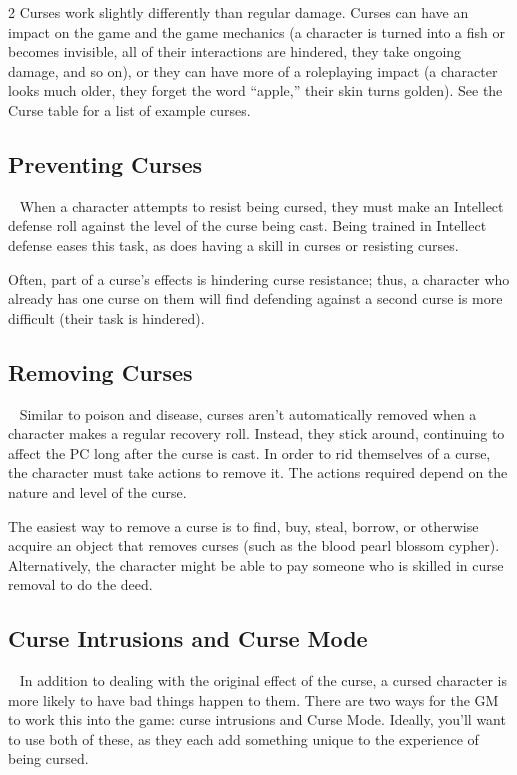 \begin{multicols}{2}
Curses work slightly differently than regular damage. Curses can have an impact on the game and the game mechanics (a character is turned into a fish or becomes invisible, all of their interactions are hindered, they take ongoing damage, and so on), or they can have more of a roleplaying impact (a character looks much older, they forget the word “apple,” their skin turns golden). See the Curse table for a list of example curses.

\subsection{Preventing Curses}
 
When a character attempts to resist being cursed, they must make an Intellect defense roll against the level of the curse being cast. Being trained in Intellect defense eases this task, as does having a skill in curses or resisting curses.

Often, part of a curse’s effects is hindering curse resistance; thus, a character who already has one curse on them will find defending against a second curse is more difficult (their task is hindered).

\subsection{Removing Curses}
 
Similar to poison and disease, curses aren’t automatically removed when a character makes a regular recovery roll. Instead, they stick around, continuing to affect the PC long after the curse is cast. In order to rid themselves of a curse, the character must take actions to remove it. The actions required depend on the nature and level of the curse.

The easiest way to remove a curse is to find, buy, steal, borrow, or otherwise acquire an object that removes curses (such as the blood pearl blossom cypher). Alternatively, the character might be able to pay someone who is skilled in curse removal to do the deed.

\subsection{Curse Intrusions and Curse Mode}
 
In addition to dealing with the original effect of the curse, a cursed character is more likely to have bad things happen to them. There are two ways for the GM to work this into the game: curse intrusions and Curse Mode. Ideally, you’ll want to use both of these, as they each add something unique to the experience of being cursed.


\end{multicols}
